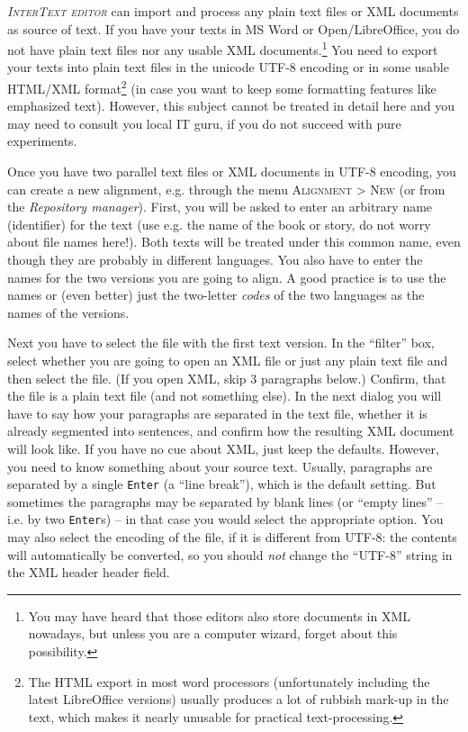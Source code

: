 \documentclass[a4paper,10pt,oneside]{book}
\newcommand{\ITeditor}{\textit{\textsc{InterText editor}}\xspace}
\newcommand{\keys}[1]{\texttt{#1}}
\newcommand{\menu}[1]{\textsc{#1}}
\begin{document}
\ITeditor can import and process any plain text files or XML documents as source of text. If you have your texts in MS Word or Open/LibreOffice, you do not have plain text files nor any usable XML documents.\footnote{You may have heard that those editors also store documents in XML nowadays, but unless you are a computer wizard, forget about this possibility.} You need to export your texts into plain text files in the unicode UTF-8 encoding or in some usable HTML/XML format\footnote{The HTML export in most word processors (unfortunately including the latest LibreOffice versions) usually produces a lot of rubbish mark-up in the text, which makes it nearly unusable for practical text-processing.} (in case you want to keep some formatting features like emphasized text). However, this subject cannot be treated in detail here and you may need to consult you local IT guru, if you do not succeed with pure experiments.

Once you have two parallel text files or XML documents in UTF-8 encoding, you can create a new alignment, e.g. through the menu \menu{Alignment} > \menu{New} (or from the \emph{Repository manager}). First, you will be asked to enter an arbitrary name (identifier) for the text (use e.g. the name of the book or story, do not worry about file names here!). Both texts will be treated under this common name, even though they are probably in different languages. You also have to enter the names for the two versions you are going to align. A good practice is to use the names or (even better) just the two-letter \emph{codes} of the two languages as the names of the versions.

Next you have to select the file with the first text version. In the ``filter'' box, select whether you are going to open an XML file or just any plain text file and then select the file. (If you open XML, skip 3 paragraphs below.) Confirm, that the file is a plain text file (and not something else). In the next dialog you will have to say how your paragraphs are separated in the text file, whether it is already segmented into sentences, and confirm how the resulting XML document will look like. If you have no cue about XML, just keep the defaults. However, you need to know something about your source text. Usually, paragraphs are separated by a single \keys{Enter} (a ``line break''), which is the default setting. But sometimes the paragraphs may be separated by blank lines (or ``empty lines'' -- i.e. by two \keys{Enter}s) -- in that case you would select the appropriate option. You may also select the encoding of the file, if it is different from UTF-8: the contents will automatically be converted, so you should \emph{not} change the ``UTF-8'' string in the XML header header field.
\end{document}
